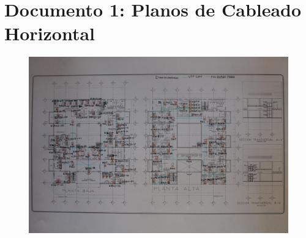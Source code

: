 \documentclass[]{article}
\begin{document}
\tableofcontents

\newpage

\section{Documento 1: Planos de Cableado Horizontal}
\begin{figure}[H]
\centering
\includegraphics[scale=0.08]{horizontal}
\caption{}
\end{figure}

\newpage
\end{document}
